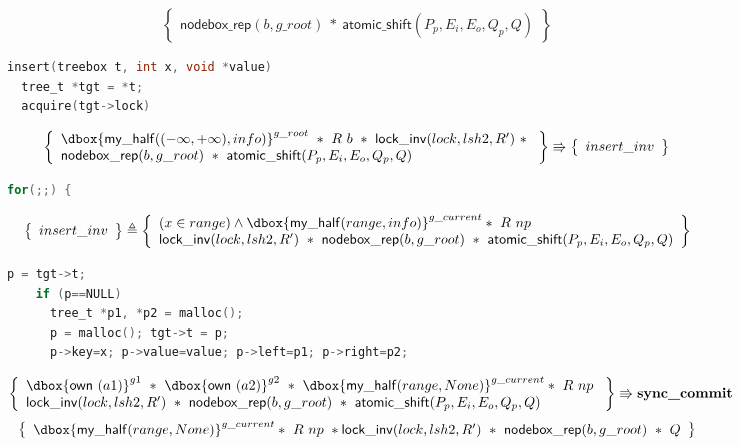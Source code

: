 \documentclass[acmsmall,screen]{acmart}\settopmatter{printfolios=true}
\newcommand\dboxed[1]{\dbox{\ensuremath{#1}}}
\newcommand{\ghost}[2]{\ensuremath{\dboxed{#1}^{#2}}}
\begin{document}
\begin{figure}[htp]
\begin{subfigure}[t]{1\textwidth}
 $$\left\{\begin{array}{l} \mathsf{nodebox\_rep}(b,g\_root)\ *\ \mathsf{atomic\_shift}(P_p,E_i,E_o,Q_p,Q)\end{array}\right\}$$
 \vspace*{-20pt}
\begin{lstlisting}[language = C,numbers = none]
insert(treebox t, int x, void *value)
  tree_t *tgt = *t;
  acquire(tgt->lock)
 \end{lstlisting}  
 $$\left\{\begin{array}{l} \ghost{\mathsf{my\_half}((-\infty,+\infty),info)}{g\_root}\ *\ R\ b\ *\ \mathsf{lock\_inv}(lock,lsh2,R')\ *\ \\
 \mathsf{nodebox\_rep}(b,g\_root)\ *\ \mathsf{atomic\_shift}(P_p,E_i,E_o,Q_p,Q)\end{array}\right\} \Rrightarrow \left\{\begin{array}{l} insert\_inv \end{array}\right\}$$ 
  \begin{lstlisting}[language = C,numbers = none]
  for(;;) {
       \end{lstlisting}   
   $$\left\{\begin{array}{l} insert\_inv \end{array}\right\} \triangleq \left\{\begin{array}{l}(x\in range)\land \ghost{\mathsf{my\_half}(range,info)}{g\_current}*\ R\ np\ \\*\mathsf{lock\_inv}(lock,lsh2,R')\ *\ \mathsf{nodebox\_rep}(b,g\_root)\ *\ \mathsf{atomic\_shift}(P_p,E_i,E_o,Q_p,Q)\end{array}\right\}$$
      \begin{lstlisting}[language = C,numbers = none]
    p = tgt->t;
    if (p==NULL)
      tree_t *p1, *p2 = malloc();
      p = malloc(); tgt->t = p;
      p->key=x; p->value=value; p->left=p1; p->right=p2;
           \end{lstlisting} 
  $$\left\{\begin{array}{l} \ghost{\mathsf{own}\ (a1)}{g1}\ *\ \ghost{\mathsf{own}\ (a2)}{g2}\ *\ \ghost{\mathsf{my\_half}(range,None)}{g\_current}*\ R\ np\ \\*\mathsf{lock\_inv}(lock,lsh2,R')\ *\ \mathsf{nodebox\_rep}(b,g\_root)\ *\ \mathsf{atomic\_shift}(P_p,E_i,E_o,Q_p,Q)\end{array}\right\} \Rrightarrow{\textbf{sync\_commit}}$$
$$\left\{\begin{array}{l} \ghost{\mathsf{my\_half}(range,None)}{g\_current}*\ R\ np\ *\mathsf{lock\_inv}(lock,lsh2,R')\ *\ \mathsf{nodebox\_rep}(b,g\_root)\ *\ Q\end{array}\right\}$$

\end{subfigure}
\end{figure}
\end{document}

